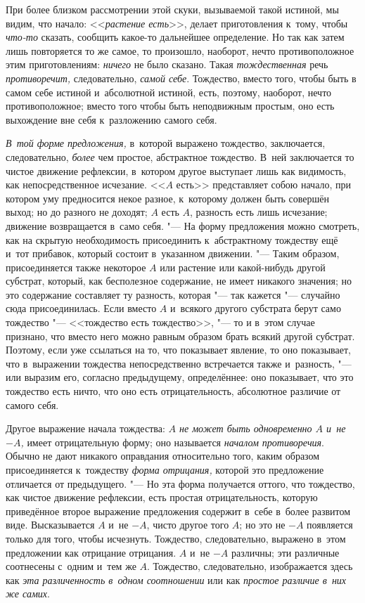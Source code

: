 При более близком рассмотрении этой скуки, вызываемой такой истиной, мы
видим, что начало: <<{\em растение есть}>>, делает
приготовления к~тому, чтобы {\em что-то} сказать,
сообщить какое-то дальнейшее определение. Но так как затем лишь повторяется
то же самое, то произошло, наоборот, нечто противоположное этим
приготовлениям: {\em ничего} не было сказано. Такая
{\em тождественная} речь {\em противоречит,} следовательно,
{\em самой себе}. Тождество, вместо того, чтобы быть в
самом себе истиной и~абсолютной истиной, есть, поэтому, наоборот, нечто
противоположное; вместо того чтобы быть неподвижным простым, оно есть
выхождение вне себя к~разложению самого себя.

{\em В~той форме предложения,} в~которой выражено
тождество, заключается, следовательно, {\em более} чем
простое, абстрактное тождество. В~ней заключается то чистое движение
рефлексии, в~котором другое выступает лишь как видимость, как
непосредственное исчезание. <<$A$ есть>> представляет собою начало,
при котором уму предносится некое разное, к~которому должен быть совершён
выход; но до разного не доходят; $A$ есть $A$, разность есть
лишь исчезание; движение возвращается в~само себя. "--- На форму предложения
можно смотреть, как на скрытую необходимость присоединить к~абстрактному
тождеству ещё и~тот прибавок, который состоит в~указанном движении. "--- Таким
образом, присоединяется также некоторое $A$ или растение или
какой-нибудь другой субстрат, который, как бесполезное содержание, не имеет
никакого значения; но это содержание составляет ту разность, которая "--- так
кажется "--- случайно сюда присоединилась. Если вместо $A$ и~всякого другого
субстрата берут само тождество "--- <<тождество есть тождество>>, "--- то и
в~этом случае признано, что вместо него можно равным образом брать всякий
другой субстрат. Поэтому, если уже ссылаться на то, что показывает явление,
то оно показывает, что в~выражении тождества непосредственно встречается
также и~разность, "--- или выразим его, согласно предыдущему, определённее:
оно показывает, что это тождество есть ничто, что оно есть отрицательность,
абсолютное различие от самого себя.

Другое выражение начала тождества: {\em $A$ не может быть
одновременно $A$ и~не $-A$,} имеет отрицательную форму; оно называется
{\em началом противоречия}. Обычно не дают никакого
оправдания относительно того, каким образом присоединяется к~тождеству
{\em форма отрицания,} которой это предложение
отличается от предыдущего. "--- Но эта форма получается оттого, что тождество,
как чистое движение рефлексии, есть простая отрицательность, которую
приведённое второе выражение предложения содержит в~себе в~более развитом
виде. Высказывается $A$ и~не $-A$, чисто другое того
$A$; но это не $-A$ появляется только для того, чтобы
исчезнуть. Тождество, следовательно, выражено в~этом предложении как
отрицание отрицания. $A$ и~не $-A$ различны; эти различные
соотнесены с~одним и~тем же $A$. Тождество, следовательно,
изображается здесь как {\em эта различенность в~одном
соотношении} или как {\em простое различие в~них же
самих}.

